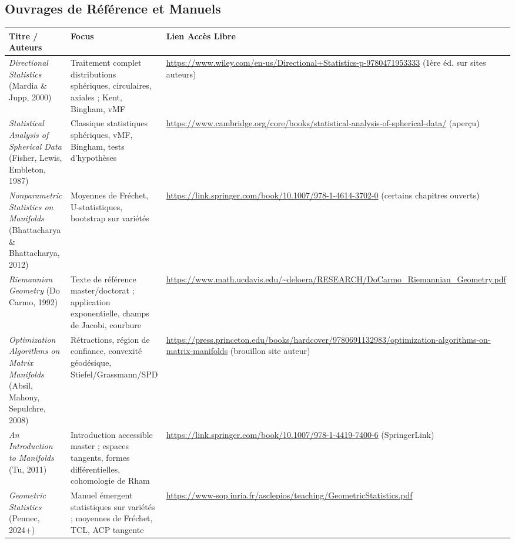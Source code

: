 \documentclass[11pt,a4paper]{article}
\begin{document}
\subsection{Ouvrages de Référence et Manuels}
\begin{longtable}{@{}p{3.5cm}p{5.5cm}p{5cm}@{}}
\toprule
\textbf{Titre / Auteurs} & \textbf{Focus} & \textbf{Lien Accès Libre} \\
\midrule
\textit{Directional Statistics} (Mardia \& Jupp, 2000) & Traitement complet distributions sphériques, circulaires, axiales ; Kent, Bingham, vMF & \url{https://www.wiley.com/en-us/Directional+Statistics-p-9780471953333} (1ère éd. sur sites auteurs) \\
\textit{Statistical Analysis of Spherical Data} (Fisher, Lewis, Embleton, 1987) & Classique statistiques sphériques, vMF, Bingham, tests d'hypothèses & \url{https://www.cambridge.org/core/books/statistical-analysis-of-spherical-data/} (aperçu) \\
\textit{Nonparametric Statistics on Manifolds} (Bhattacharya \& Bhattacharya, 2012) & Moyennes de Fréchet, U-statistiques, bootstrap sur variétés & \url{https://link.springer.com/book/10.1007/978-1-4614-3702-0} (certains chapitres ouverts) \\
\textit{Riemannian Geometry} (Do Carmo, 1992) & Texte de référence master/doctorat ; application exponentielle, champs de Jacobi, courbure & \url{https://www.math.ucdavis.edu/~deloera/RESEARCH/DoCarmo_Riemannian_Geometry.pdf} \\
\textit{Optimization Algorithms on Matrix Manifolds} (Absil, Mahony, Sepulchre, 2008) & Rétractions, région de confiance, convexité géodésique, Stiefel/Grassmann/SPD & \url{https://press.princeton.edu/books/hardcover/9780691132983/optimization-algorithms-on-matrix-manifolds} (brouillon site auteur) \\
\textit{An Introduction to Manifolds} (Tu, 2011) & Introduction accessible master ; espaces tangents, formes différentielles, cohomologie de Rham & \url{https://link.springer.com/book/10.1007/978-1-4419-7400-6} (SpringerLink) \\
\textit{Geometric Statistics} (Pennec, 2024+) & Manuel émergent statistiques sur variétés ; moyennes de Fréchet, TCL, ACP tangente & \url{https://www-sop.inria.fr/asclepios/teaching/GeometricStatistics.pdf} \\
\bottomrule
\end{longtable}
\end{document}
